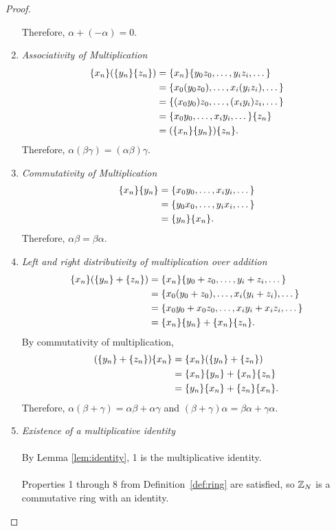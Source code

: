 \begin{proof}
\begin{enumerate}
      Therefore, $\alpha+(-\alpha)=0$.
    \item {\em Associativity of Multiplication}
      \begin{align*}
        \{x_n\}(\{y_n\}\{z_n\})&=\{x_n\}\{y_0z_0,\dots,y_iz_i,\dots\} \\
                   &=\{x_0(y_0z_0),\dots,x_i(y_iz_i),\dots\} \\
                   &=\{(x_0y_0)z_0,\dots,(x_iy_i)z_i,\dots\} \\
                   &=\{x_0y_0,\dots,x_iy_i,\dots\}\{z_n\} \\
                   &=(\{x_n\}\{y_n\})\{z_n\}.
      \end{align*}
      Therefore, $\alpha(\beta\gamma)=(\alpha\beta)\gamma$.
    \setcounter{enumi}{6}
    \item {\em Commutativity of Multiplication}
      \begin{align*}
        \{x_n\}\{y_n\}&=\{x_0y_0,\dots,x_iy_i,\dots\} \\
              &=\{y_0x_0,\dots,y_ix_i,\dots\} \\
              &=\{y_n\}\{x_n\}.
      \end{align*}
      Therefore, $\alpha\beta=\beta\alpha$.
    \setcounter{enumi}{5}
    \item {\em Left and right distributivity of multiplication over addition}
      \begin{align*}
        \{x_n\}(\{y_n\}+\{z_n\})&=\{x_n\}\{y_0+z_0,\dots,y_i+z_i,\dots\} \\
                    &=\{x_0(y_0+z_0),\dots,x_i(y_i+z_i),\dots\} \\
                    &=\{x_0y_0+x_0z_0,\dots,x_iy_i+x_iz_i,\dots\} \\
                    &=\{x_n\}\{y_n\}+\{x_n\}\{z_n\}. \\
      \end{align*}
      By commutativity of multiplication,
      \begin{align*}
        (\{y_n\}+\{z_n\})\{x_n\}&=\{x_n\}(\{y_n\}+\{z_n\})\\
                    &=\{x_n\}\{y_n\}+\{x_n\}\{z_n\}\\
                    &=\{y_n\}\{x_n\}+\{z_n\}\{x_n\}.
      \end{align*}
      Therefore, $\alpha(\beta+\gamma)=\alpha\beta+\alpha\gamma$ and
      $(\beta+\gamma)\alpha=\beta\alpha+\gamma\alpha$.
    \setcounter{enumi}{7}
    \item {\em Existence of a multiplicative identity}
      \\ \\
      By Lemma \ref{lem:identity}, 1 is the multiplicative identity.
      \\ \\
      Properties 1 through 8 from Definition~\ref{def:ring} are satisfied,
      so $\mathbb{Z}_N$ is a commutative ring with an identity.
  \end{enumerate}
\end{proof}

